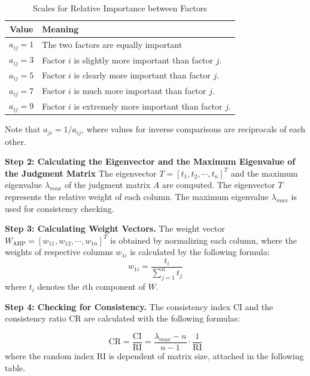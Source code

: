 \documentclass{mcmthesis}
\begin{document}
\setlength{\tabcolsep}{12pt} 
\begin{center}
\begin{longtable}{cl}
\caption{Scales for Relative Importance between Factors} 
\label{tab:AHP_factors} \\

\toprule
\textbf{Value} & \textbf{Meaning} \\
\midrule
\endfirsthead

\bottomrule
\endlastfoot

$a_{ij} = 1$ & The two factors are equally important \\
$a_{ij} = 3$ & Factor $i$ is slightly more important than factor $j$. \\
$a_{ij} = 5$ & Factor $i$ is clearly more important than factor $j$. \\
$a_{ij} = 7$ & Factor $i$ is much more important than factor $j$. \\
$a_{ij} = 9$ & Factor $i$ is extremely more important than factor $j$. \\

\end{longtable}
\end{center}
Note that $a_{ji} = 1 / a_{ij}$, where values for inverse comparisons are reciprocals of each other. 

\textbf{Step 2: Calculating the Eigenvector and the Maximum Eigenvalue of the Judgment Matrix} The eigenvector $T = [t_1, t_2, \cdots, t_n]^T$ and the maximum eigenvalue $\lambda_{max}$ of the judgment matrix $A$ are computed. The eigenvector $T$ represents the relative weight of each column. The maximum eigenvalue $\lambda_{max}$ is used for consistency checking. 

\textbf{Step 3: Calculating Weight Vectors.} The weight vector $W_\text{AHP} = [w_{11},w_{12},\cdots , w_{1n}]^T$ is obtained by normalizing each column, where the weights of respective columns $w_{1i}$ is calculated by the following formula: 
\begin{equation} \label{eq:AHP_weight}
    w_{1i} = \frac{t_i}{\sum^n_{j=1} t_j}
\end{equation}
where $t_i$ denotes the $i$th component of $W$. 

\textbf{Step 4: Checking for Consistency.} The consistency index $\text{CI}$ and the consistency ratio $\text{CR}$ are calculated with the following formulas: 

\begin{equation} \label{eq:AHP_CR}
    \text{CR} = \frac{\text{CI}}{\text{RI}} = \frac{\lambda_{max} - n}{n-1} \cdot \frac{1}{\text{RI}}
\end{equation}
where the random index $\text{RI}$ is dependent of matrix size, attached in the following table. 
\end{document}
